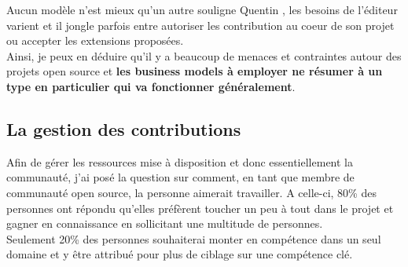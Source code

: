 			Aucun modèle n'est mieux qu'un autre souligne Quentin , les besoins de l'éditeur varient et il jongle parfois entre autoriser les contribution au coeur de son projet ou accepter les extensions proposées.\\

			Ainsi, je peux en déduire qu'il y a beaucoup de menaces et contraintes autour des projets open source et \textbf{les business models à employer ne résumer à un type en particulier qui va fonctionner généralement}.

		\subsection{La gestion des contributions}

			Afin de gérer les ressources mise à disposition et donc essentiellement la communauté, j'ai posé la question sur comment, en tant que membre de communauté open source, la personne aimerait travailler. A celle-ci, 80\% des personnes ont répondu qu'elles préfèrent toucher un peu à tout dans le projet et gagner en connaissance en sollicitant une multitude de personnes.\\

			Seulement 20\% des personnes souhaiterai monter en compétence dans un seul domaine et y être attribué pour plus de ciblage sur une compétence clé.

